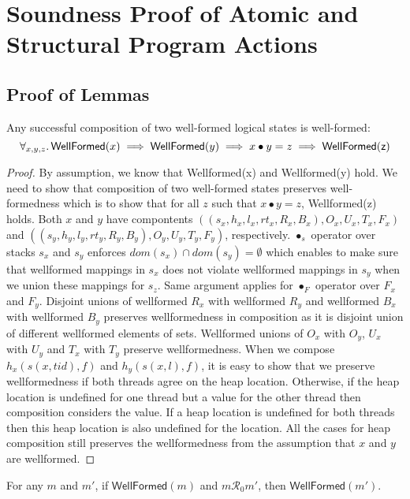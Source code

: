 \section{Soundness Proof of Atomic and Structural Program Actions}
\subsection{Proof of Lemmas}
\label{sec:prooflemmas}
\begin{lemma}
\label{lem:wf-composition}
Any successful composition of two well-formed logical states is well-formed:\[\forall_{x,y,z}\ldotp \mathsf{WellFormed}(x) \implies \mathsf{WellFormed}(y) \implies x\bullet y = z \implies \mathsf{WellFormed(z)}\]
\end{lemma}
\begin{proof}
By assumption, we know that \textsf{Wellformed}(x) and \textsf{Wellformed}(y) hold. We need to show that composition of two well-formed states preserves well-formedness which is to show that for all $z$ such that $x\bullet y = z$, \textsf{Wellformed}(z) holds.
  Both $x$ and $y$ have compontents $((s_x,h_x,l_x,rt_x,R_x,B_x),O_x,U_x,T_x,F_x)$ and $((s_y,h_y,l_y,rt_y,R_y,B_y),O_y,U_y,T_y,F_y)$, respectively. $\bullet_s$ operator over stacks $s_x$ and $s_y$ enforces $dom(s_x) \cap dom(s_y) = \emptyset$ which enables to make sure that wellformed mappings in $s_x$ does not violate wellformed mappings in $s_y$ when we union these mappings for $s_z$. Same argument applies for $\bullet_F$ operator over $F_x$ and $F_y$. Disjoint unions of wellformed $R_x$ with wellformed $R_y$ and wellformed $B_x$ with wellformed $B_y$ preserves wellformedness in composition as it is disjoint union of different wellformed elements of sets. Wellformed unions of $O_x$ with $O_y$,  $U_x$ with $U_y$  and $T_x$ with $T_y$ preserve wellformedness. When we compose $h_x(s(x,tid),f)$ and $h_y(s(x,l),f)$, it is easy to show that we preserve wellformedness if both threads agree on the heap location. Otherwise, if the heap location is undefined for one thread but a value for the other thread then composition considers the value. If a heap location is undefined for both threads then this heap location is also undefined for the location. All the cases for heap composition still preserves the wellformedness from the assumption that $x$ and $y$ are wellformed. 
  \end{proof}
\begin{lemma}
For any $m$ and $m'$, if $\mathsf{WellFormed}(m)$ and $m\mathcal{R}_0m'$, then $\mathsf{WellFormed}(m')$.
\end{lemma}
